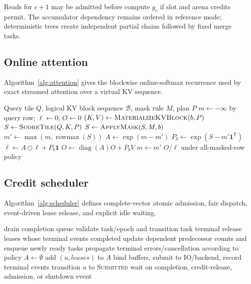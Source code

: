 Reads for $c+1$ may be admitted before compute $g_c$ if slot and arena credits permit. The accumulator dependency remains ordered in reference mode; deterministic trees create independent partial chains followed by fixed merge tasks.

\subsection{Online attention}

Algorithm~\ref{alg:attention} gives the blockwise online-softmax recurrence used by exact streamed attention over a virtual KV sequence.

\begin{algorithm}[H]
\caption{External-memory exact attention for one query tile}
\label{alg:attention}
\begin{algorithmic}[1]
\Require Query tile $Q$, logical KV block sequence $\mathcal B$, mask rule $M$, plan $P$
\State $m\gets-\infty$ by query row; $\ell\gets0$; $O\gets0$
  \State $(K,V)\gets\Call{MaterializeKVBlock}{b,P}$
  \State $S\gets\Call{ScoreTile}{Q,K,P}$
  \State $S\gets\Call{ApplyMask}{S,M,b}$
  \State $m'\gets\max(m,\operatorname{rowmax}(S))$
  \State $A\gets\exp(m-m')$
  \State $P_b\gets\exp(S-m'\mathbf 1^{\mathsf T})$
  \State $\ell\gets A\odot\ell+P_b\mathbf 1$
  \State $O\gets\operatorname{diag}(A)O+P_bV$
  \State $m\gets m'$
  \State {}
\EndFor
\State \Return $O/\ell$ under all-masked-row policy
\end{algorithmic}
\end{algorithm}

\subsection{Credit scheduler}

Algorithm~\ref{alg:scheduler} defines complete-vector atomic admission, fair dispatch, event-driven lease release, and explicit idle waiting.

\begin{algorithm}[H]
\caption{Resource-admitting scheduler loop}
\label{alg:scheduler}
\begin{algorithmic}[1]
  \State drain completion queue
    \State validate task/epoch and transition task terminal
    \State release leases whose terminal events completed
    \State update dependent predecessor counts and enqueue newly ready tasks
    \State propagate terminal errors/cancellation according to policy
  \EndFor
  \State $A\gets\emptyset$
      \State add $(u,leases)$ to $A$
    \EndIf
  \EndFor
    \State bind buffers, submit to IO/backend, record terminal events
    \State transition $u$ to \textsc{Submitted}
  \EndFor
    \State wait on completion, credit-release, admission, or shutdown event
  \EndIf
\EndWhile
\end{algorithmic}
\end{algorithm}

